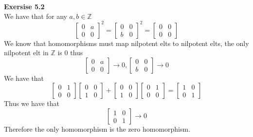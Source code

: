 \documentclass[12pt]{article}
\newenvironment{ques}[1]{\textbf{Exersise #1}\vspace{1 mm}\\ }{\bigskip}
\theoremstyle{definition}
\newcommand{\Z}{\mathbb Z}
\begin{document}
\begin{ques}{5.2}
	We have that for any $a,b \in \Z$
	$$\begin{bmatrix} 0 & a \\ 0 & 0 \end{bmatrix}^2 = \begin{bmatrix} 0 & 0 \\
	b & 0 \end{bmatrix}^2 =	\begin{bmatrix} 0 & 0
	\\ 0 & 0 \end{bmatrix}$$
	We know that homomorphisms must map nilpotent elts to nilpotent elts, the
	only nilpotent elt in $\Z$ is $0$ thus
	$$\begin{bmatrix} 0 & a \\ 0 & 0 \end{bmatrix} \to 0, \begin{bmatrix} 0 & 0
	\\ b & 0 \end{bmatrix} \to 0$$
	We have that 
	$$\begin{bmatrix} 0 & 1 \\ 0 & 0 \end{bmatrix}\begin{bmatrix} 0 & 0 \\ 1 &
	0 \end{bmatrix} + \begin{bmatrix} 0 & 0 \\ 1 & 0
	\end{bmatrix}\begin{bmatrix} 0 & 1 \\ 0 & 0 \end{bmatrix}= \begin{bmatrix}
	1 & 0 \\ 0 & 1 \end{bmatrix} $$
	Thus we have that
	$$\begin{bmatrix} 1 & 0 \\ 0 & 1 \end{bmatrix} \to 0$$
	Therefore the only homomorphism is the zero homomorphism.
\end{ques}
\end{document}
